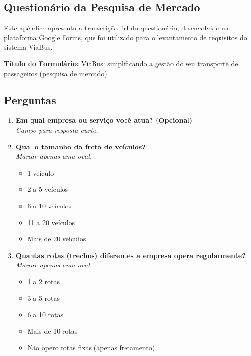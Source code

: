 
\begin{apendicesenv}
  \chapter{Questionário da Pesquisa de Mercado}
  \label{apendice:questionario}

  Este apêndice apresenta a transcrição fiel do questionário, desenvolvido na plataforma Google Forms, que foi utilizado para o levantamento de requisitos do sistema ViaBus.

  \vspace{1cm} %

  \noindent\textbf{Título do Formulário:} ViaBus: simplificando a gestão do seu transporte de passageiros (pesquisa de mercado)

  \section*{Perguntas}
  \begin{enumerate}
    \item \textbf{Em qual empresa ou serviço você atua? (Opcional)} \\
          \textit{Campo para resposta curta.}

    \item \textbf{Qual o tamanho da frota de veículos?} \\
          \textit{Marcar apenas uma oval.}
          \begin{itemize}
            \item 1 veículo
            \item 2 a 5 veículos
            \item 6 a 10 veículos
            \item 11 a 20 veículos
            \item Mais de 20 veículos
          \end{itemize}

    \item \textbf{Quantas rotas (trechos) diferentes a empresa opera regularmente?} \\
          \textit{Marcar apenas uma oval.}
          \begin{itemize}
            \item 1 a 2 rotas
            \item 3 a 5 rotas
            \item 6 a 10 rotas
            \item Mais de 10 rotas
            \item Não opero rotas fixas (apenas fretamento)
          \end{itemize}


\end{enumerate}
\end{apendicesenv}
